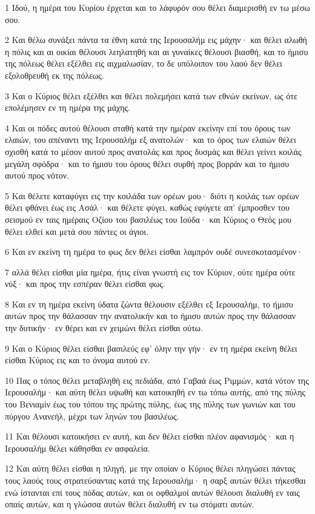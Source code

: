 \par 1 Ιδού, η ημέρα του Κυρίου έρχεται και το λάφυρόν σου θέλει διαμερισθή εν τω μέσω σου.
\par 2 Και θέλω συνάξει πάντα τα έθνη κατά της Ιερουσαλήμ εις μάχην· και θέλει αλωθή η πόλις και αι οικίαι θέλουσι λεηλατηθή και αι γυναίκες θέλουσι βιασθή, και το ήμισυ της πόλεως θέλει εξέλθει εις αιχμαλωσίαν, το δε υπόλοιπον του λαού δεν θέλει εξολοθρευθή εκ της πόλεως.
\par 3 Και ο Κύριος θέλει εξέλθει και θέλει πολεμήσει κατά των εθνών εκείνων, ως ότε επολέμησεν εν τη ημέρα της μάχης.
\par 4 Και οι πόδες αυτού θέλουσι σταθή κατά την ημέραν εκείνην επί του όρους των ελαιών, του απέναντι της Ιερουσαλήμ εξ ανατολών· και το όρος των ελαιών θέλει σχισθή κατά το μέσον αυτού προς ανατολάς και προς δυσμάς και θέλει γείνει κοιλάς μεγάλη σφόδρα· και το ήμισυ του όρους θέλει συρθή προς βορράν και το ήμισυ αυτού προς νότον.
\par 5 Και θέλετε καταφύγει εις την κοιλάδα των ορέων μου· διότι η κοιλάς των ορέων θέλει φθάνει έως εις Ασάλ· και θέλετε φύγει, καθώς εφύγετε απ' έμπροσθεν του σεισμού εν ταις ημέραις Οζίου του βασιλέως του Ιούδα· και Κύριος ο Θεός μου θέλει ελθεί και μετά σου πάντες οι άγιοι.
\par 6 Και εν εκείνη τη ημέρα το φως δεν θέλει είσθαι λαμπρόν ουδέ συνεσκοτασμένον·
\par 7 αλλά θέλει είσθαι μία ημέρα, ήτις είναι γνωστή εις τον Κύριον, ούτε ημέρα ούτε νύξ· και προς την εσπέραν θέλει είσθαι φως.
\par 8 Και εν τη ημέρα εκείνη ύδατα ζώντα θέλουσιν εξέλθει εξ Ιερουσαλήμ, το ήμισυ αυτών προς την θάλασσαν την ανατολικήν και το ήμισυ αυτών προς την θάλασσαν την δυτικήν· εν θέρει και εν χειμώνι θέλει είσθαι ούτω.
\par 9 Και ο Κύριος θέλει είσθαι βασιλεύς εφ' όλην την γήν· εν τη ημέρα εκείνη θέλει είσθαι Κύριος εις και το όνομα αυτού εν.
\par 10 Πας ο τόπος θέλει μεταβληθή εις πεδιάδα, από Γαβαά έως Ριμμών, κατά νότον της Ιερουσαλήμ· και αύτη θέλει υψωθή και κατοικηθή εν τω τόπω αυτής, από της πύλης του Βενιαμίν έως του τόπου της πρώτης πύλης, έως της πύλης των γωνιών και του πύργου Ανανεήλ, μέχρι των ληνών του βασιλέως.
\par 11 Και θέλουσι κατοικήσει εν αυτή, και δεν θέλει είσθαι πλέον αφανισμός· και η Ιερουσαλήμ θέλει κάθησθαι εν ασφαλεία.
\par 12 Και αύτη θέλει είσθαι η πληγή, με την οποίαν ο Κύριος θέλει πληγώσει πάντας τους λαούς τους στρατεύσαντας κατά της Ιερουσαλήμ· η σαρξ αυτών θέλει τήκεσθαι ενώ ίστανται επί τους πόδας αυτών, και οι οφθαλμοί αυτών θέλουσι διαλυθή εν ταις οπαίς αυτών, και η γλώσσα αυτών θέλει διαλυθή εν τω στόματι αυτών.
